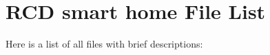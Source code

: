 \section{RCD smart home File List}
Here is a list of all files with brief descriptions:\begin{CompactList}
\item{}
\end{CompactList}
